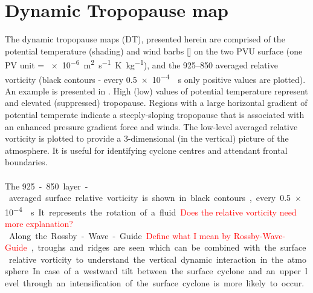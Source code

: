 \section{Dynamic Tropopause map}
\label{sec:DT}
The dynamic tropopause maps (DT), presented herein are comprised of the potential temperature (shading) and wind barbs [\SI{}{\mPs}] on the two PVU surface (one PV unit = \SI{e-6}{\metre\squared\per\s\kelvin\per\kg}), and the \num{925}--\SI{850}{\hPa} averaged relative vorticity (black contours - every \SI{.5e-4}{\per\second} only positive values are plotted).  An example is presented in .
High (low) values of potential temperature represent and elevated (suppressed) tropopause.  Regions with a large horizontal gradient of potential temperate indicate  a steeply-sloping tropopause that is associated with an enhanced pressure gradient force and winds.  The low-level averaged relative vorticity is plotted to provide a 3-dimensional (in the vertical) picture of the atmosphere.  It is useful for identifying cyclone centres and attendant frontal boundaries.
\\
\\
The  \SI{925}-\SI{850}{\hPa} layer-averaged surface relative vorticity is shown in black contours, every \SI{.5e-4}{\per\second}. It represents the rotation of a fluid. \textcolor{red}{Does the relative vorticity need more explanation? }
\\
Along the Rossby-Wave-Guide \textcolor{red}{Define what I mean by Rossby-Wave-Guide}, troughs and ridges are seen which can be combined with the surface relative vorticity to understand the vertical dynamic interaction in the atmosphere. In case of a westward tilt between the surface cyclone and an upper level through an intensification of the surface cyclone is more likely to occur.
